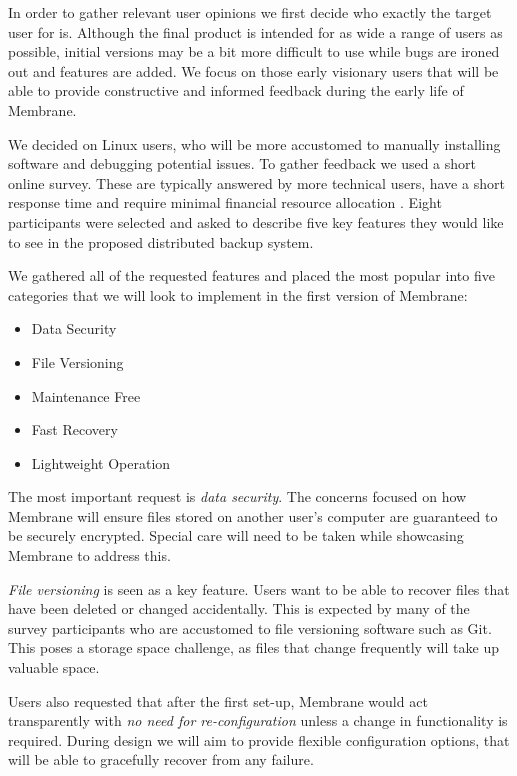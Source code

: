 \documentclass[11pt, a4paper, twoside]{report}
\begin{document}
In order to gather relevant user opinions we first decide who exactly the target user for is. Although the final product is intended for as wide a range of users as possible, initial versions may be a bit more difficult to use while bugs are ironed out and features are added. We focus on those early visionary users that will be able to provide constructive and informed feedback during the early life of Membrane. \label{txt:adv-users}

We decided on Linux users, who will be more accustomed to manually installing software and debugging potential issues. To gather feedback we used a short online survey. These are typically answered by more technical users, have a short response time and require minimal financial resource allocation \citep{ilieva2002online}. Eight participants were selected and asked to describe five key features they would like to see in the proposed distributed backup system.

We gathered all of the requested features and placed the most popular into five categories that we will look to implement in the first version of Membrane:

\begin{itemize}
 \item Data Security
 \item File Versioning
 \item Maintenance Free
 \item Fast Recovery
 \item Lightweight Operation
\end{itemize}

The most important request is \emph{data security}. The concerns focused on how Membrane will ensure files stored on another user's computer are guaranteed to be securely encrypted. Special care will need to be taken while showcasing Membrane to address this.

\emph{File versioning} is seen as a key feature. Users want to be able to recover files that have been deleted or changed accidentally. This is expected by many of the survey participants who are accustomed to file versioning software such as Git. This poses a storage space challenge, as files that change frequently will take up valuable space.

Users also requested that after the first set-up, Membrane would act transparently with \emph{no need for re-configuration} unless a change in functionality is required. During design we will aim to provide flexible configuration options, that will be able to gracefully recover from any failure.
\end{document}
